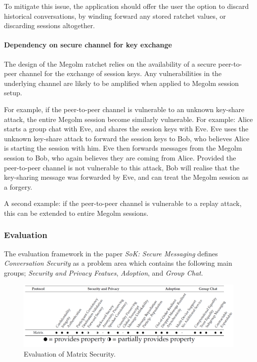 To mitigate this issue, the application should offer the user the option to discard historical conversations, by winding forward any stored ratchet values, or discarding sessions altogether.

\paragraph{Dependency on secure channel for key exchange}
The design of the Megolm ratchet relies on the availability of a secure peer-to-peer channel for the exchange of session keys. Any vulnerabilities in the underlying channel are likely to be amplified when applied to Megolm session setup.

For example, if the peer-to-peer channel is vulnerable to an unknown key-share attack, the entire Megolm session become similarly vulnerable. For example: Alice starts a group chat with Eve, and shares the session keys with Eve. Eve uses the unknown key-share attack to forward the session keys to Bob, who believes Alice is starting the session with him. Eve then forwards messages from the Megolm session to Bob, who again believes they are coming from Alice. Provided the peer-to-peer channel is not vulnerable to this attack, Bob will realise that the key-sharing message was forwarded by Eve, and can treat the Megolm session as a forgery.

A second example: if the peer-to-peer channel is vulnerable to a replay attack, this can be extended to entire Megolm sessions.






\subsubsection{Evaluation}
The evaluation framework in the paper \emph{SoK: Secure Messaging} defines \emph{Conversation Security} as a problem area which contains the following main groups; \emph{Security and Privacy Featues}, \emph{Adoption}, and \emph{Group Chat}.


\begin{figure}[H]
	\centering
	\includegraphics[width=12cm]{figures/framework.png}
	\caption{Evaluation of Matrix Security.}
	\label{fig:framework}
\end{figure}

